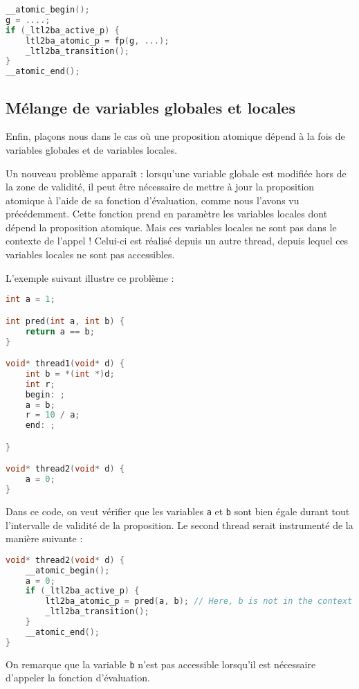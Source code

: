\begin{lstlisting}[language=C]
__atomic_begin();
g = ....;
if (_ltl2ba_active_p) {
    ltl2ba_atomic_p = fp(g, ...);
    _ltl2ba_transition();
}
__atomic_end();
\end{lstlisting}

\subsection{Mélange de variables globales et locales}

Enfin, plaçons nous dans le cas où une proposition atomique dépend à la
fois de variables globales et de variables locales.

Un nouveau problème apparaît : lorsqu'une variable globale est modifiée
hors de la zone de validité, il peut être nécessaire de mettre à jour la
proposition atomique à l'aide de sa fonction d'évaluation, comme nous
l'avons vu précédemment. Cette fonction prend en paramètre les variables
locales dont dépend la proposition atomique. Mais ces variables locales
ne sont pas dans le contexte de l'appel ! Celui-ci est réalisé depuis un
autre thread, depuis lequel ces variables locales ne sont pas
accessibles.

L'exemple suivant illustre ce problème :

\begin{lstlisting}[language=C]
int a = 1;

int pred(int a, int b) {
    return a == b;
}

void* thread1(void* d) {
    int b = *(int *)d;
    int r;
    begin: ;
    a = b;
    r = 10 / a;
    end: ;

}

void* thread2(void* d) {
    a = 0;
}
\end{lstlisting}

Dans ce code, on veut vérifier que les variables \texttt{a} et
\texttt{b} sont bien égale durant tout l'intervalle de validité de la
proposition. Le second thread serait instrumenté de la manière suivante
:

\begin{lstlisting}[language=C]
void* thread2(void* d) {
    __atomic_begin();
    a = 0;
    if (_ltl2ba_active_p) {
        ltl2ba_atomic_p = pred(a, b); // Here, b is not in the context
        _ltl2ba_transition();
    }
    __atomic_end();
}
\end{lstlisting}

On remarque que la variable \texttt{b} n'est pas accessible lorsqu'il
est nécessaire d'appeler la fonction d'évaluation.


